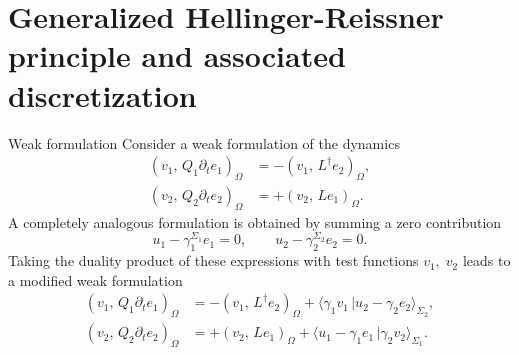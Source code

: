 \documentclass[aspectratio=169]{beamer}
\newcommand{\inner}[3][]{\ensuremath{( #2, \, #3 )_{#1}}}
\newcommand{\dualpr}[3][]{\ensuremath{\langle #2 \, \vert #3 \rangle_{#1}}}
\begin{document}
\section{Generalized Hellinger-Reissner principle and associated discretization}

\begin{frame}{Weak formulation}
	Consider a weak formulation of the dynamics
	\begin{equation*}
		\begin{aligned}
			\inner[\Omega]{v_1}{Q_1 \partial_t e_1} &= -\inner[\Omega]{v_1}{L^\dag e_2}, \\
			\inner[\Omega]{v_2}{Q_2 \partial_t e_2} &= +\inner[\Omega]{v_2}{L e_1}.
		\end{aligned}
	\end{equation*}
	A completely analogous formulation is obtained by summing a zero contribution
	\begin{equation*}
		u_1 - \gamma_1^{\Sigma_1} e_1 = 0, \qquad u_2 - \gamma_2^{\Sigma_2} e_2 =0.
	\end{equation*}
	Taking the duality product of these expressions with test functions $v_1,  \; v_2$ leads to a modified weak formulation
	\begin{equation*}
		\begin{aligned}
			\inner[\Omega]{v_1}{Q_1 \partial_t e_1} &= -\inner[\Omega]{v_1}{L^\dag e_2} + \dualpr[\Sigma_2]{\gamma_1 v_1}{u_2 - \gamma_2 e_2}, \\
			\inner[\Omega]{v_2}{Q_2 \partial_t e_2} &= +\inner[\Omega]{v_2}{L e_1} + \dualpr[\Sigma_1]{u_1 - \gamma_1 e_1}{\gamma_2 v_2}.
		\end{aligned}
	\end{equation*}
\end{frame}
\end{document}
